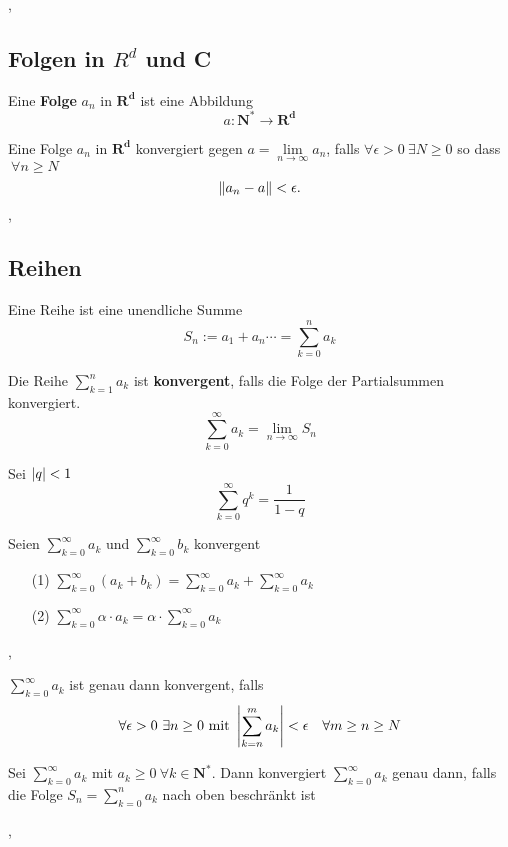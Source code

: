\sep

\subsection{Folgen in $R^{d}$ und C}

\Def[2.6.1] Eine \textbf{Folge} $a_n$ in $\mathbf{R^{d}}$ ist eine Abbildung
\[
a: \mathbf{N}^{*} \longrightarrow \mathbf{R^{d}}
\] 

\Def[2.6.2] Eine Folge $a_n$ in $\mathbf{R^{d}}$ konvergiert gegen ${a = \lim\limits_{n \rightarrow \infty} a_{n}}$, falls $ \forall \epsilon > 0 \ \exists N \geq 0$ so dass $\ \forall n\geq N$
\[
 \left\lVert a_n-a \right\rVert < \epsilon.
\]
\sep

\subsection{Reihen}

\Def[2.7.0] Eine Reihe ist eine unendliche Summe
\[S_{n} := a_{1} + a_{n} \cdots = \sum_{k=0}^{n} a_{k}\]

\Def[2.7.1] Die Reihe $\sum_{k=1}^{n} a_{k}$ ist \textbf{konvergent}, falls die Folge der Partialsummen konvergiert. 
\[\sum_{k=0}^{\infty} a_{k} = \lim\limits_{n \rightarrow \infty} S_{n} \]

 Sei $\left\lvert q \right\rvert < 1$
\[\sum_{k=0}^{\infty} q^k = \frac{1}{1-q} \]

\Satz[2.7.4] Seien $\sum_{k=0}^{\infty} a_{k}$ und $\sum_{k=0}^{\infty} b_{k}$ konvergent
\begin{enumerate}
\item[(1)] $\sum_{k=0}^{\infty} (a_{k} + b_{k}) = \sum_{k=0}^{\infty} a_{k} + \sum_{k=0}^{\infty} a_{k}$ 
\item[(2)] $\sum_{k=0}^{\infty} \alpha \cdot a_{k} = \alpha \cdot \sum_{k=0}^{\infty} a_{k}$
\end{enumerate}

\sep

 $\sum_{k=0}^{\infty} a_{k}$ ist genau dann konvergent, falls
\[ \forall \epsilon > 0 \ \exists n \geq 0 \text{ mit } \left\lvert \sum_{k=n}^{m} a_{k} \right\rvert < \epsilon \quad \forall m \geq n \geq N\]

\Satz[2.7.6] Sei $\sum_{k=0}^{\infty} a_{k}$ mit $a_{k} \geq  0 \ \forall k \in \mathbf{N}^{*}$. Dann konvergiert
$\sum_{k=0}^{\infty} a_{k}$ genau dann, falls die Folge $S_{n} = \sum_{k=0}^{n} a_{k}$ nach oben beschränkt ist

\sep

